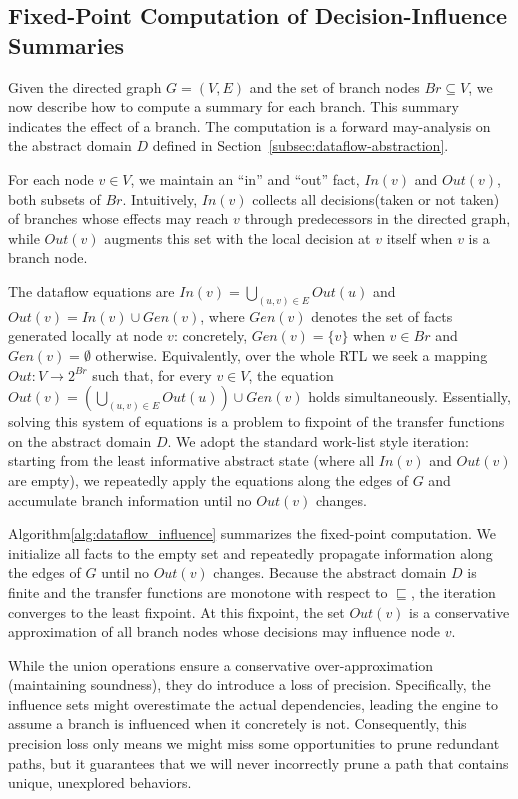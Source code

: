 \documentclass[conference]{IEEEtran}
\begin{document}
\subsection{Fixed-Point Computation of Decision-Influence Summaries}
\label{subsec:fixpoint-summaries}

Given the directed graph $G = (V,E)$ and the set of branch nodes
$Br \subseteq V$, we now describe how to compute a summary for each branch. This summary indicates the effect of a branch. The computation is a forward may-analysis on the abstract domain $D$ defined in Section~\ref{subsec:dataflow-abstraction}.

For each node $v \in V$, we maintain an ``in'' and ``out'' fact,
$In(v)$ and $Out(v)$, both subsets of $Br$. Intuitively, $In(v)$
collects all decisions(taken or not taken) of branches whose effects may reach $v$ through
predecessors in the directed graph, while $Out(v)$ augments this set
with the local decision at $v$ itself when $v$ is a branch node.

The dataflow equations are $In(v) = \bigcup_{(u, v) \in E} Out(u)$ and $Out(v) = In(v) \cup Gen(v)$, where $Gen(v)$ denotes the set of facts generated
locally at node $v$: concretely, $Gen(v) = \{v\}$ when $v \in Br$ and $Gen(v) = \emptyset$ otherwise. Equivalently, over the whole RTL we
seek a mapping $Out : V \to 2^{Br}$ such that, for every $v \in V$, the equation $Out(v) = \left(\bigcup_{(u, v) \in E} Out(u)\right) \cup Gen(v)$ holds simultaneously. Essentially, solving this system of equations is a problem to fixpoint of the transfer functions on the abstract domain $D$. We adopt the standard work-list style iteration: starting from the least informative abstract state (where all $In(v)$ and $Out(v)$ are empty), we repeatedly apply the equations along the edges of $G$ and accumulate branch information until no $Out(v)$ changes. 

Algorithm\ref{alg:dataflow_influence} summarizes the fixed-point
computation. We initialize all facts to the empty set and repeatedly
propagate information along the edges of $G$ until no $Out(v)$ changes.
Because the abstract domain $D$ is finite and the transfer functions are
monotone with respect to $\sqsubseteq$, the iteration converges to the
least fixpoint. At this fixpoint, the set
$Out(v)$ is a conservative approximation of all branch
nodes whose decisions may influence node $v$.

While the union operations ensure a conservative over-approximation (maintaining soundness), they do introduce a loss of precision. Specifically, the influence sets might overestimate the actual dependencies, leading the engine to assume a branch is influenced when it concretely is not. Consequently, this precision loss only means we might miss some opportunities to prune redundant paths, but it guarantees that we will never incorrectly prune a path that contains unique, unexplored behaviors.
\end{document}
